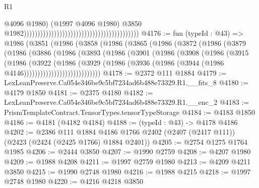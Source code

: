 \begin{lexlean}{R1}
\begin{coremodule}
                                                                                          @4096
                                                                                          @1980)
                                                                                        (@1997
                                                                                          @4096
                                                                                          @1980)
                                                                                        @3850
                                                                                        @1982))))))))))))))))))))))))))))))))))))))))))
@4176 := fun (typeId : @43) =>
  @1986
    (@3851
      (@1986
        (@3858
          (@1986
            (@3865
              (@1986
                (@3872
                  (@1986
                    (@3879
                      (@1986
                        (@3886
                          (@1986
                            (@3893
                              (@1986
                                (@3901
                                  (@1986
                                    (@3908
                                      (@1986
                                        (@3915
                                          (@1986
                                            (@3922
                                              (@1986
                                                (@3929
                                                  (@1986
                                                    (@3936
                                                      (@1986
                                                        (@3944
                                                          (@1986 @4146))))))))))))))))))))))))))))
@4178 := @2372 @111 @1884
@4179 := LexLeanPreserve.Ca054e346be9c5bf7234ad6b488e73329.R1.__fits_8
@4180 := @4179 @1850
@4181 := @2375 @4180
@4182 := LexLeanPreserve.Ca054e346be9c5bf7234ad6b488e73329.R1.__enc_2
@4183 := PrismTemplateContract.TensorTypes.tensorTypeStorage
@4184 := @4183 @1850
@4186 := @4181 (@4182 @4184)
@4188 := (typeId : @43) -> @4178 @4186
@4202 := @2386
    @111
    @1884
    @4186
    @1766
    @2402
    (@2407 (@2417 @111))
    (@2423 (@2424 (@2425 @1766) @1884 @2401))
@4205 := @2754 @1275 @1764 @1985
@4206 := @2444 @3850
@4207 := @1990 @2759
@4208 := @4207 @1980
@4209 := @1988 @4208
@4211 := @1997 @2759 @1980
@4213 := @4209 @4211 @3850
@4215 := @1990 @2748 @1980
@4216 := @1988 @4215
@4218 := @1997 @2748 @1980
@4220 := @4216 @4218 @3850

\end{coremodule}
\end{lexlean}
